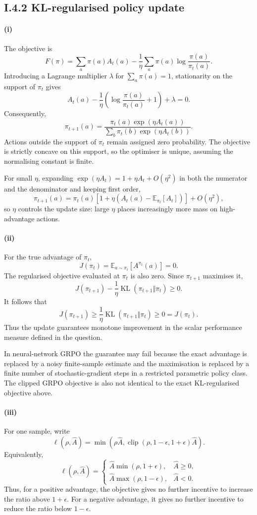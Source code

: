 \documentclass[11pt]{article}
\begin{document}
\subsection*{I.4.2 KL-regularised policy update}

\paragraph{(i)}
The objective is
\[
F(\pi)
=
\sum_a\pi(a)A_t(a)
-\frac{1}{\eta}
\sum_a\pi(a)\log\frac{\pi(a)}{\pi_t(a)}.
\]
Introducing a Lagrange multiplier $\lambda$ for $\sum_a\pi(a)=1$, stationarity
on the support of $\pi_t$ gives
\[
A_t(a)
-\frac{1}{\eta}
\left(
\log\frac{\pi(a)}{\pi_t(a)}+1
\right)
+\lambda=0.
\]
Consequently,
\[
\pi_{t+1}(a)
=
\frac{\pi_t(a)\exp(\eta A_t(a))}
{\sum_b\pi_t(b)\exp(\eta A_t(b))}.
\]
Actions outside the support of $\pi_t$ remain assigned zero probability. The
objective is strictly concave on this support, so the optimiser is unique,
assuming the normalising constant is finite.

For small $\eta$, expanding $\exp(\eta A_t)=1+\eta A_t+O(\eta^2)$ in both the numerator and the denominator and keeping first order,
\[
\pi_{t+1}(a)
=
\pi_t(a)
\left[
1+\eta\left(A_t(a)-\mathbb{E}_{\pi_t}[A_t]\right)
\right]
+O(\eta^2),
\]
so $\eta$ controls the update size: large $\eta$ places increasingly more mass on high-advantage actions.

\paragraph{(ii)}
For the true advantage of $\pi_t$,
\[
J(\pi_t)
=
\mathbb{E}_{a\sim\pi_t}[A^{\pi_t}(a)]
=0.
\]
The regularised objective evaluated at $\pi_t$ is also zero. Since
$\pi_{t+1}$ maximises it,
\[
J(\pi_{t+1})
-\frac{1}{\eta}
\operatorname{KL}(\pi_{t+1}\Vert\pi_t)
\geq 0.
\]
It follows that
\[
J(\pi_{t+1})
\geq
\frac{1}{\eta}
\operatorname{KL}(\pi_{t+1}\Vert\pi_t)
\geq 0
=
J(\pi_t).
\]
Thus the update guarantees monotone improvement in the scalar performance
measure defined in the question.

In neural-network GRPO the guarantee may fail because the exact advantage is
replaced by a noisy finite-sample estimate and the maximisation is replaced by
a finite number of stochastic-gradient steps in a restricted parametric policy
class. The clipped GRPO objective is also not identical to the exact
KL-regularised objective above.

\paragraph{(iii)}
For one sample, write
\[
\ell(\rho,\hat A)
=
\min\left(
\rho\hat A,
\operatorname{clip}(\rho,1-\epsilon,1+\epsilon)\hat A
\right).
\]
Equivalently,
\[
\ell(\rho,\hat A)
=
\begin{cases}
\hat A\min(\rho,1+\epsilon), & \hat A\geq 0,\\[2mm]
\hat A\max(\rho,1-\epsilon), & \hat A<0.
\end{cases}
\]
Thus, for a positive advantage, the objective gives no further incentive to
increase the ratio above $1+\epsilon$. For a negative advantage, it gives no
further incentive to reduce the ratio below $1-\epsilon$.
\end{document}
